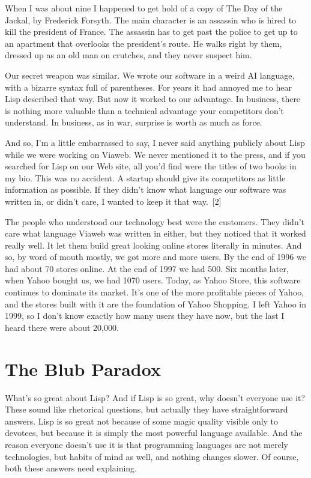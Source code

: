 \documentclass[10pt,twoside,openright]{memoir}
\begin{document}
When I was about nine I happened to get hold of a copy of The Day of the Jackal, by Frederick Forsyth. The main character is an assassin who is hired to kill the president of France. The assassin has to get past the police to get up to an apartment that overlooks the president's route. He walks right by them, dressed up as an old man on crutches, and they never suspect him.

Our secret weapon was similar. We wrote our software in a weird AI language, with a bizarre syntax full of parentheses. For years it had annoyed me to hear Lisp described that way. But now it worked to our advantage. In business, there is nothing more valuable than a technical advantage your competitors don't understand. In business, as in war, surprise is worth as much as force.

And so, I'm a little embarrassed to say, I never said anything publicly about Lisp while we were working on Viaweb. We never mentioned it to the press, and if you searched for Lisp on our Web site, all you'd find were the titles of two books in my bio. This was no accident. A startup should give its competitors as little information as possible. If they didn't know what language our software was written in, or didn't care, I wanted to keep it that way.~[2]

The people who understood our technology best were the customers. They didn't care what language Viaweb was written in either, but they noticed that it worked really well. It let them build great looking online stores literally in minutes. And so, by word of mouth mostly, we got more and more users. By the end of 1996 we had about 70 stores online. At the end of 1997 we had 500. Six months later, when Yahoo bought us, we had 1070 users. Today, as Yahoo Store, this software continues to dominate its market. It's one of the more profitable pieces of Yahoo, and the stores built with it are the foundation of Yahoo Shopping. I left Yahoo in 1999, so I don't know exactly how many users they have now, but the last I heard there were about 20,000.

\section{The Blub Paradox}

What's so great about Lisp? And if Lisp is so great, why doesn't everyone use it? These sound like rhetorical questions, but actually they have straightforward answers. Lisp is so great not because of some magic quality visible only to devotees, but because it is simply the most powerful language available. And the reason everyone doesn't use it is that programming languages are not merely technologies, but habits of mind as well, and nothing changes slower. Of course, both these answers need explaining.
\end{document}
